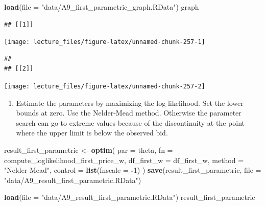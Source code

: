 \documentclass[]{book}
\newenvironment{Shaded}{\begin{snugshade}}{\end{snugshade}}
\newcommand{\KeywordTok}[1]{\textcolor[rgb]{0.13,0.29,0.53}{\textbf{#1}}}
\newcommand{\DataTypeTok}[1]{\textcolor[rgb]{0.13,0.29,0.53}{#1}}
\newcommand{\DecValTok}[1]{\textcolor[rgb]{0.00,0.00,0.81}{#1}}
\newcommand{\StringTok}[1]{\textcolor[rgb]{0.31,0.60,0.02}{#1}}
\newcommand{\OperatorTok}[1]{\textcolor[rgb]{0.81,0.36,0.00}{\textbf{#1}}}
\newcommand{\NormalTok}[1]{#1}
\providecommand{\tightlist}{%
  \setlength{\itemsep}{0pt}\setlength{\parskip}{0pt}}
\begin{document}
\begin{Shaded}
\begin{Highlighting}[]
\KeywordTok{load}\NormalTok{(}\DataTypeTok{file =} \StringTok{"data/A9_first_parametric_graph.RData"}\NormalTok{)}
\NormalTok{graph}
\end{Highlighting}
\end{Shaded}

\begin{verbatim}
## [[1]]
\end{verbatim}

\begin{center}\texttt{[image: lecture\_files/figure-latex/unnamed-chunk-257-1]} \end{center}

\begin{verbatim}
## 
## [[2]]
\end{verbatim}

\begin{center}\texttt{[image: lecture\_files/figure-latex/unnamed-chunk-257-2]} \end{center}

\begin{enumerate}
\def\labelenumi{\arabic{enumi}.}
\setcounter{enumi}{8}
\tightlist
\item
  Estimate the parameters by maximizing the log-likelihood. Set the
  lower bounds at zero. Use the Nelder-Mead method. Otherwise the
  parameter search can go to extreme values because of the discontinuity
  at the point where the upper limit is below the observed bid.
\end{enumerate}

\begin{Shaded}
\begin{Highlighting}[]
\NormalTok{result_first_parametric <-}
\StringTok{  }\KeywordTok{optim}\NormalTok{(}
    \DataTypeTok{par =}\NormalTok{ theta,}
    \DataTypeTok{fn =}\NormalTok{ compute_loglikelihood_first_price_w,}
    \DataTypeTok{df_first_w =}\NormalTok{ df_first_w,}
    \DataTypeTok{method =} \StringTok{"Nelder-Mead"}\NormalTok{,}
    \DataTypeTok{control =} \KeywordTok{list}\NormalTok{(}\DataTypeTok{fnscale =} \OperatorTok{-}\DecValTok{1}\NormalTok{)}
\NormalTok{  )}
\KeywordTok{save}\NormalTok{(result_first_parametric, }\DataTypeTok{file =} \StringTok{"data/A9_result_first_parametric.RData"}\NormalTok{)}
\end{Highlighting}
\end{Shaded}

\begin{Shaded}
\begin{Highlighting}[]
\KeywordTok{load}\NormalTok{(}\DataTypeTok{file =} \StringTok{"data/A9_result_first_parametric.RData"}\NormalTok{)}
\NormalTok{result_first_parametric}
\end{Highlighting}
\end{Shaded}
\end{document}
